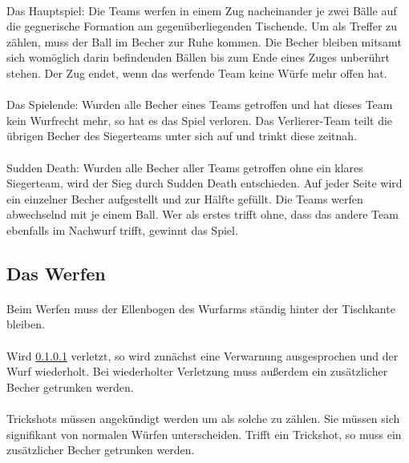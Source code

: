\paragraph{}
Das Hauptspiel: Die Teams werfen in einem Zug nacheinander je zwei Bälle auf die gegnerische Formation am gegenüberliegenden Tischende.
Um als Treffer zu zählen, muss der Ball im Becher zur Ruhe kommen.
Die Becher bleiben mitsamt sich womöglich darin befindenden Bällen bis zum Ende eines Zuges unberührt stehen.
Der Zug endet, wenn das werfende Team keine Würfe mehr offen hat.

\paragraph{}
Das Spielende: Wurden alle Becher eines Teams getroffen und hat dieses Team kein Wurfrecht mehr, so hat es das Spiel verloren.
Das Verlierer-Team teilt die übrigen Becher des Siegerteams unter sich auf und trinkt diese zeitnah.

\paragraph{}
\glqq Sudden Death\grqq{}: Wurden alle Becher aller Teams getroffen ohne ein klares Siegerteam, wird der Sieg durch Sudden Death entschieden.
Auf jeder Seite wird ein einzelner Becher aufgestellt und zur Hälfte gefüllt.
Die Teams werfen abwechselnd mit je einem Ball.
Wer als erstes trifft ohne, dass das andere Team ebenfalls im Nachwurf trifft, gewinnt das Spiel.

\subsection{Das Werfen}
\paragraph{}\label{Bier-Pong:Werfen:Ellenbogen}
Beim Werfen muss der Ellenbogen des Wurfarms ständig hinter der Tischkante bleiben.

\paragraph{}
Wird \ref{Bier-Pong:Werfen:Ellenbogen} verletzt, so wird zunächst eine Verwarnung ausgesprochen und der Wurf wiederholt.
Bei wiederholter Verletzung muss außerdem ein zusätzlicher Becher getrunken werden.

\paragraph{}
\glqq Trickshots\grqq{} müssen angekündigt werden um als solche zu zählen.
Sie müssen sich signifikant von normalen Würfen unterscheiden.
Trifft ein Trickshot, so muss ein zusätzlicher Becher getrunken werden.

